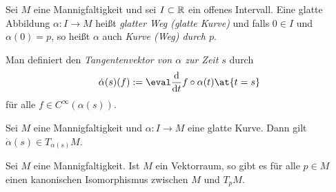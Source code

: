 \begin{definition}
  Sei $M$ eine Mannigfaltigkeit und sei $I\subset \mathbb{R}$ ein offenes Intervall. Eine glatte
  Abbildung $\alpha \colon I \to M$ heißt \emph{glatter Weg (glatte
    Kurve)} und falls $0\in I$ und $\alpha(0) = p$, so heißt $\alpha$
  auch \emph{Kurve (Weg) durch $p$}.

  Man definiert den \emph{Tangentenvektor von $\alpha$ zur Zeit $s$} durch
  \begin{equation*}
    \dot\alpha(s)(f) := \eval\ddt f\circ\alpha(t)\at{t=s} 
  \end{equation*}
  für alle $f\in C^\infty(\alpha(s))$.
\end{definition}

\begin{proposition}
  Sei $M$ eine Mannigfaltigkeit und $\alpha \colon I \to M$ eine
  glatte Kurve. Dann gilt $\dot\alpha(s) \in T_{\alpha(s)}M$.
\end{proposition}

\begin{proposition}
  Sei $M$ eine Mannigfaltigkeit. Ist $M$ ein Vektorraum, so gibt es
  für alle $p\in M$
  einen kanonischen Isomorphismus zwischen $M$ und $T_pM$.
\end{proposition}

